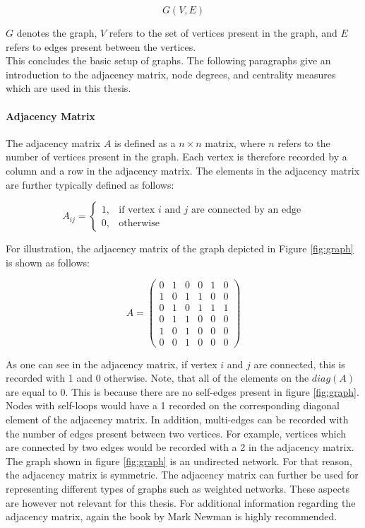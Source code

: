 	\begin{equation}
		G(V,E)
	\end{equation}

	\noindent $G$ denotes the graph, $V$ refers to the set of vertices present 
	in the graph, and $E$ refers to edges present between the vertices. \\

	\noindent This concludes the basic setup of graphs. The following 
	paragraphs give an introduction to the adjacency matrix, node degrees, and 
	centrality measures which are used in this thesis.

	\paragraph{Adjacency Matrix} \mbox{} 

	\noindent The adjacency matrix $A$ is defined as a $n \times n$ matrix, 
	where $n$ refers to the number of vertices present in the graph. Each 
	vertex is therefore recorded by a column and a row in the adjacency matrix. 
	The elements in the adjacency matrix are further typically defined as follows:

	\begin{equation}
		A_{ij} = 
			\begin{cases}
				1, & \text{if vertex $i$ and $j$ are connected by an edge} \\
				0, & \text{otherwise}
			\end{cases}
	\end{equation}
	
	\noindent For illustration, the adjacency matrix of the graph depicted in 
	Figure \ref{fig:graph} is shown as follows:

	\[ A = 
	\begin{pmatrix}
		0 & 1 & 0 & 0 & 1 & 0 \\
		1 & 0 & 1 & 1 & 0 & 0 \\
		0 & 1 & 0 & 1 & 1 & 1 \\
		0 & 1 & 1 & 0 & 0 & 0 \\
		1 & 0 & 1 & 0 & 0 & 0 \\
		0 & 0 & 1 & 0 & 0 & 0  
	\end{pmatrix}
	\] 
	
	\noindent As one can see in the adjacency matrix, if vertex $i$ and $j$ are 
	connected, this is recorded with 1 and 0 otherwise. Note, that all of the 
	elements on the $diag(A)$ are equal to 0. This is because there are no 
	self-edges present in figure \ref{fig:graph}. Nodes with self-loops would 
	have a 1 recorded on the corresponding diagonal element of the adjacency 
	matrix. In addition, multi-edges can be recorded with the number of edges
	present between two vertices. For example, vertices which are connected by
	two edges would be recorded with a 2 in the adjacency matrix. The graph
	shown in figure \ref{fig:graph} is an undirected network. For that reason, 
	the adjacency matrix is symmetric. The adjacency matrix can further be used 
	for representing different types of graphs such as weighted networks. These 
	aspects are however not relevant for this thesis. For additional information 
	regarding the adjacency matrix, again the book by Mark Newman 
	\citeyearpar{Newman2010} is highly recommended. 

